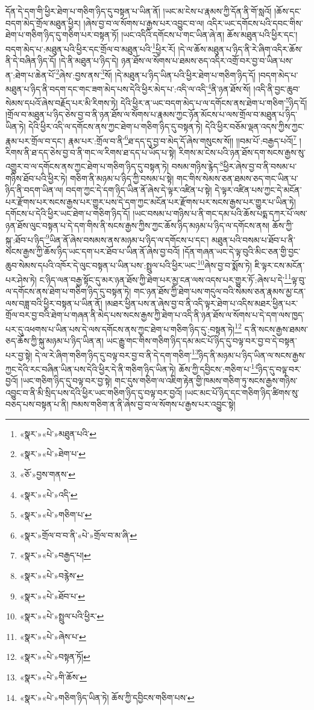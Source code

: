 དོན་དེ་དག་གི་ཕྱིར་ཐེག་པ་གཅིག་ཉིད་དུ་བསྟན་པ་ཡིན་ནོ། །ཡང་མ་ངེས་པ་རྣམས་ཀྱི་དོན་ནི་གོ་སླའོ། །ཆོས་དང་བདག་མེད་གྲོལ་མཐུན་ཕྱིར། །ཞེས་བྱ་བ་ལ་སོགས་པ་རྒྱས་པར་འབྱུང་བ་ལ། འདིར་ཡང་དགོངས་པའི་དབང་གིས་ཐེག་པ་གཅིག་ཉིད་དུ་གཅིག་པར་བསྟན་ཏོ། །ཡང་འདིའི་དགོངས་པ་གང་ཡིན་ཞེ་ན། ཆོས་མཐུན་པའི་ཕྱིར་དང་། བདག་མེད་པ་:མཐུན་པའི་ཕྱིར་དང་གྲོལ་བ་མཐུན་པའི་\footnote{«སྣར་»«པེ་»མཐུན་པའི་}ཕྱིར་རོ། །དེ་ལ་ཆོས་མཐུན་པ་ཉིད་ནི་རེ་ཞིག་འདིར་ཆོས་ནི་དེ་བཞིན་ཉིད་དོ། །དེ་ནི་མཐུན་པ་ཉིད་དེ། ཉན་ཐོས་ལ་སོགས་པ་ཐམས་ཅད་འདིར་འགྲོ་བར་བྱ་བ་ཡིན་པས་ན་:ཐེག་པ་ཆེན་པོ་\footnote{«སྣར་»«པེ་»ཐེག་པ་}ཞེས་:བྱས་ནས་\footnote{«ཅོ་»བྱས་གནས་}སོ། །དེ་མཐུན་པ་ཉིད་ཡིན་པའི་ཕྱིར་ཐེག་པ་གཅིག་ཉིད་དོ། །བདག་མེད་པ་མཐུན་པ་ཉིད་ནི་བདག་དང་གང་ཟག་མེད་པས་དེའི་ཕྱིར་མེད་པ་:འདི་ལ་འདི་\footnote{«སྣར་»«པེ་»འདི་}ནི་ཉན་ཐོས་སོ། །འདི་ནི་བྱང་ཆུབ་སེམས་དཔའོ་ཞེས་བརྗོད་པར་མི་རིགས་ཏེ། དེའི་ཕྱིར་ན་ཡང་བདག་མེད་པ་ལ་དགོངས་ནས་ཐེག་པ་གཅིག་\footnote{«སྣར་»«པེ་»གཅིག་པ་}ཉིད་དོ། །གྲོལ་བ་མཐུན་པ་ཉིད་ཅེས་བྱ་བ་ནི་ཉན་ཐོས་ལ་སོགས་པ་རྣམས་ཀྱང་ཉོན་མོངས་པ་ལས་གྲོལ་བ་མཐུན་པ་ཉིད་ཡིན་ཏེ། དེའི་ཕྱིར་འདི་ལ་དགོངས་ནས་ཀྱང་ཐེག་པ་གཅིག་ཉིད་དུ་བསྟན་ཏེ། དེའི་ཕྱིར་བཅོམ་ལྡན་འདས་ཀྱིས་ཀྱང་རྣམ་པར་གྲོལ་བ་དང་། རྣམ་པར་:གྲོལ་བ་ནི་\footnote{«སྣར་»གྲོལ་བ་བ་ནི་«པེ་»གྲོལ་བ་མ་ཞི་}ཐ་དད་དུ་བྱ་བ་མེད་དོ་ཞེས་གསུངས་སོ།། །།བམ་པོ་:བརྒྱད་པའོ།\footnote{«སྣར་»«པེ་»བརྒྱད་པ།} །རིགས་ནི་ཐ་དད་ཅེས་བྱ་བ་ནི་གང་ལ་རིགས་ཐ་དད་པ་ཡོད་པ་སྟེ། རིགས་མ་ངེས་པའི་ཉན་ཐོས་དག་སངས་རྒྱས་སུ་འགྱུར་བ་ལ་དགོངས་ནས་ཀྱང་ཐེག་པ་གཅིག་ཉིད་དུ་བསྟན་ཏེ། བསམ་གཉིས་རྙེད་\footnote{«སྣར་»«པེ་»བརྙེས་}ཕྱིར་ཞེས་བྱ་བ་ནི་བསམ་པ་གཉིས་ཐོབ་པའི་ཕྱིར་ཏེ། གཅིག་ནི་མཉམ་པ་ཉིད་ཀྱི་བསམ་པ་སྟེ། གང་གིས་སེམས་ཅན་ཐམས་ཅད་གང་ཡིན་པ་ཉིད་ནི་བདག་ཡིན་ལ། བདག་ཀྱང་དེ་དག་ཉིད་ཡིན་ནོ་ཞེས་དེ་ལྟར་འཛིན་པ་སྟེ། དེ་ལྟར་འཛིན་པས་ཀྱང་དེ་མངོན་པར་རྫོགས་པར་སངས་རྒྱས་པར་གྱུར་པས་དེ་དག་ཀྱང་མངོན་པར་རྫོགས་པར་སངས་རྒྱས་པར་གྱུར་པ་ཡིན་ཏེ། དགོངས་པ་དེའི་ཕྱིར་ཡང་ཐེག་པ་གཅིག་ཉིད་དོ། །ཡང་བསམ་པ་གཉིས་པ་ནི་གང་དམ་པའི་ཆོས་པདྨ་དཀར་པོ་ལས་ཉན་ཐོས་ལུང་བསྟན་པ་དེ་དག་གིས་ནི་སངས་རྒྱས་ཀྱིས་ཀྱང་ཆོས་ཉིད་མཉམ་པ་ཉིད་ལ་དགོངས་ནས། ཆོས་ཀྱི་སྐུ་:ཐོབ་པ་ཉིད་\footnote{«སྣར་»«པེ་»ཐོབ་པ་}ཡིན་ནོ་ཞེས་བསམས་ནས་མཉམ་པ་ཉིད་ལ་དགོངས་པ་དང་། མཐུན་པའི་བསམ་པ་ཐོབ་པ་ནི་སངས་རྒྱས་ཀྱི་ཆོས་ཉིད་ཡང་དག་པར་ཐོབ་པ་ཡིན་ནོ་ཞེས་བྱ་བའོ། །དོན་གཞན་ཡང་དེ་ལྟ་བུའི་མིང་ཅན་གྱི་བྱང་ཆུབ་སེམས་དཔའི་འཁོར་དེ་ལུང་བསྟན་པ་ཡིན་པས་:སྤྲུལ་པའི་ཕྱིར་ཡང་\footnote{«སྣར་»«པེ་»སྤྲུལ་པའི་ཕྱིར་}ཞེས་བྱ་བ་སྨོས་ཏེ། ཇི་ལྟར་ངས་མངོན་པར་ཤེས་ཏེ། ང་ཉིད་ལན་བརྒྱ་སྟོང་དུ་མར་ཉན་ཐོས་ཀྱི་ཐེག་པར་མྱ་ངན་ལས་འདས་པར་གྱུར་ཏོ་:ཞེས་པ་དེ་\footnote{«སྣར་»«པེ་»ཞེས་པ་}ལྟ་བུ་ལ་དགོངས་ནས་ཐེག་པ་གཅིག་ཉིད་དུ་བསྟན་ཏེ། གང་ཉན་ཐོས་ཀྱི་ཐེག་པས་གདུལ་བའི་སེམས་ཅན་རྣམས་མྱ་ངན་ལས་བཟླ་བའི་ཕྱིར་བསྟན་པ་ཡིན་ནོ། །མཐར་ཕྱིན་པས་ན་ཞེས་བྱ་བ་ནི་འདི་ལྟར་ཐེག་པ་འདིས་མཐར་ཕྱིན་པར་གྲོལ་བར་བྱ་བའི་ཐེག་པ་གཞན་ནི་མེད་པས་སངས་རྒྱས་ཀྱི་ཐེག་པ་འདི་ནི་ཉན་ཐོས་ལ་སོགས་པ་དེ་དག་ལས་ཁྱད་པར་དུ་འཕགས་པ་ཡིན་པས་དེ་ལས་དགོངས་ནས་ཀྱང་ཐེག་པ་གཅིག་ཉིད་དུ་:བསྟན་ཏེ།\footnote{«སྣར་»«པེ་»བསྟན་ཏོ།} ད་ནི་སངས་རྒྱས་ཐམས་ཅད་ཆོས་ཀྱི་སྐུ་མཉམ་པ་ཉིད་ཡིན་ན། ཡང་རྒྱུ་གང་གིས་གཅིག་ཉིད་དམ་མང་པོ་ཉིད་དུ་བལྟ་བར་བྱ་བ་དེ་བསྟན་པར་བྱ་སྟེ། དེ་ལ་རེ་ཞིག་གཅིག་ཉིད་དུ་བལྟ་བར་བྱ་བ་ནི་དེ་དག་གཅིག་\footnote{«སྣར་»«པེ་»གི་ཆོས་}ཉིད་ནི་མཉམ་པ་ཉིད་ཡིན་ལ་སངས་རྒྱས་ཀྱང་དེའི་རང་བཞིན་ཡིན་པས་དེའི་ཕྱིར་དེ་ནི་གཅིག་ཉིད་ཡིན་ཏེ། ཆོས་ཀྱི་དབྱིངས་:གཅིག་པ་\footnote{«སྣར་»«པེ་»གཅིག་ཉིད་ཡིན་ཏེ། ཆོས་ཀྱི་དབྱིངས་གཅིག་པས་}ཉིད་དུ་བལྟ་བར་བྱའོ། །ཡང་གཅིག་ཉིད་དུ་བལྟ་བར་བྱ་སྟེ། གང་དུས་གཅིག་ལ་འཇིག་རྟེན་གྱི་ཁམས་གཅིག་ཏུ་སངས་རྒྱས་གཉིས་འབྱུང་བ་ནི་མི་སྲིད་པས་དེའི་ཕྱིར་ཡང་གཅིག་ཉིད་དུ་བལྟ་བར་བྱའོ། །ཡང་མང་པོ་ཉིད་དང་གཅིག་ཉིད་ཚིགས་སུ་བཅད་པས་བསྟན་པ་ནི། ཁམས་གཅིག་ན་ནི་ཞེས་བྱ་བ་ལ་སོགས་པ་རྒྱས་པར་འབྱུང་སྟེ། 